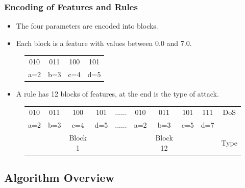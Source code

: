 \documentclass{beamer}
\begin{document}
\begin{frame}
	\frametitle{Encoding of Features and Rules}
	\begin{itemize}
	\item The four parameters are encoded into blocks.
	\item Each block is a feature with values between 0.0 and 7.0.
	\end{itemize}
	
\begin{figure}
\begin{tabular}{|cccc|} \hline
010 & 011 & 100 & 101\\
a=2 & b=3 & c=4 & d=5\\
\hline\end{tabular}
\end{figure}

	\begin{itemize}
	\item A rule has 12 blocks of features, at the end is the type of attack.
	\end{itemize}

\begin{figure}
\begin{tabular}{|cccc|c|cccc|c|} \hline
010 & 011 & 100 & 101   & ...... & 010 & 011 & 101 & 111   & DoS\\
a=2 & b=3 & c=4 & d=5   & ...... & a=2 & b=3 & c=5 & d=7   &\\ 
    &     & Block 1&    &        &     & Block 12& &       & Type\\
\hline\end{tabular}
\end{figure}

\end{frame}


\subsection{Algorithm Overview}
\end{document}
